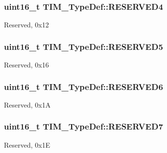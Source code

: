 \subsubsection[{\texorpdfstring{R\+E\+S\+E\+R\+V\+E\+D4}{RESERVED4}}]{\setlength{\rightskip}{0pt plus 5cm}uint16\+\_\+t T\+I\+M\+\_\+\+Type\+Def\+::\+R\+E\+S\+E\+R\+V\+E\+D4}\hypertarget{struct_t_i_m___type_def_a36afe894c9b0878347d0c038c80e4c22}{}\label{struct_t_i_m___type_def_a36afe894c9b0878347d0c038c80e4c22}
Reserved, 0x12 
\subsubsection[{\texorpdfstring{R\+E\+S\+E\+R\+V\+E\+D5}{RESERVED5}}]{\setlength{\rightskip}{0pt plus 5cm}uint16\+\_\+t T\+I\+M\+\_\+\+Type\+Def\+::\+R\+E\+S\+E\+R\+V\+E\+D5}\hypertarget{struct_t_i_m___type_def_a15944db86d7a7a69db35512f68eca15c}{}\label{struct_t_i_m___type_def_a15944db86d7a7a69db35512f68eca15c}
Reserved, 0x16 
\subsubsection[{\texorpdfstring{R\+E\+S\+E\+R\+V\+E\+D6}{RESERVED6}}]{\setlength{\rightskip}{0pt plus 5cm}uint16\+\_\+t T\+I\+M\+\_\+\+Type\+Def\+::\+R\+E\+S\+E\+R\+V\+E\+D6}\hypertarget{struct_t_i_m___type_def_a7fd09a4911f813464a454b507832a0b9}{}\label{struct_t_i_m___type_def_a7fd09a4911f813464a454b507832a0b9}
Reserved, 0x1A 
\subsubsection[{\texorpdfstring{R\+E\+S\+E\+R\+V\+E\+D7}{RESERVED7}}]{\setlength{\rightskip}{0pt plus 5cm}uint16\+\_\+t T\+I\+M\+\_\+\+Type\+Def\+::\+R\+E\+S\+E\+R\+V\+E\+D7}\hypertarget{struct_t_i_m___type_def_a4157fa8f6e188281292f019ea24f5599}{}\label{struct_t_i_m___type_def_a4157fa8f6e188281292f019ea24f5599}
Reserved, 0x1E 
